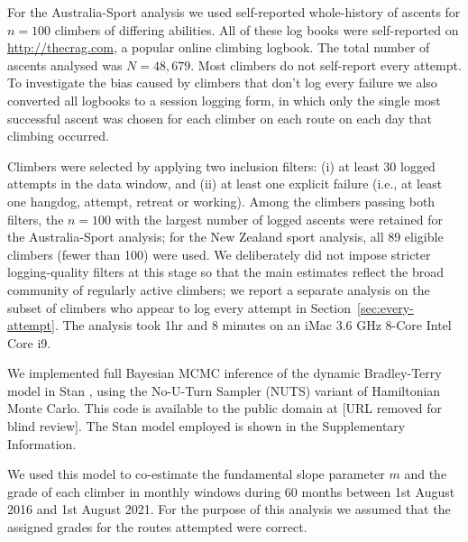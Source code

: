 \documentclass[12pt]{article}
\begin{document}
For the Australia-Sport analysis we used self-reported whole-history of ascents for $n=100$ climbers of differing abilities. All of these log books were self-reported on \url{http://thecrag.com}, a popular online climbing logbook. The total number of ascents analysed was $N=48{,}679$. Most climbers do not self-report every attempt. To investigate the bias caused by climbers that don't log every failure we also converted all logbooks to a session logging form, in which only the single most successful ascent was chosen for each climber on each route on each day that climbing occurred.

Climbers were selected by applying two inclusion filters: (i) at least 30 logged attempts in the data window, and (ii) at least one explicit failure (i.e., at least one \gls{hangdog}, attempt, retreat or working). Among the climbers passing both filters, the $n=100$ with the largest number of logged ascents were retained for the Australia-Sport analysis; for the New Zealand sport analysis, all 89 eligible climbers (fewer than 100) were used. We deliberately did not impose stricter logging-quality filters at this stage so that the main estimates reflect the broad community of regularly active climbers; we report a separate analysis on the subset of climbers who appear to log every attempt in Section~\ref{sec:every-attempt}. The analysis took 1hr and 8 minutes on an iMac 3.6 GHz 8-Core Intel Core i9.

We implemented full Bayesian MCMC inference of the dynamic Bradley-Terry model in Stan \citep{carpenter2017stan}, using the No-U-Turn Sampler (NUTS) variant of Hamiltonian Monte Carlo. This code is available to the public domain at [URL removed for blind review].
The Stan model employed is shown in the Supplementary Information.

We used this model to co-estimate the fundamental slope parameter $m$ and the grade of each climber in monthly windows during 60 months between 1st August 2016 and 1st August 2021. For the purpose of this analysis we assumed that the assigned grades for the routes attempted were correct.
\end{document}

